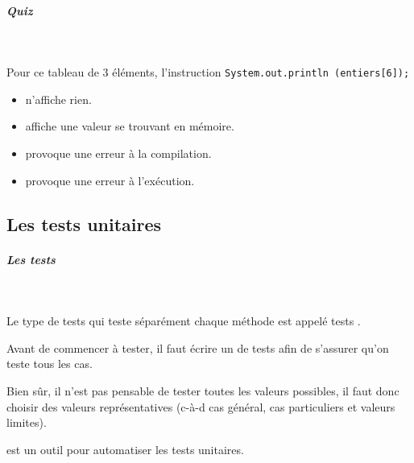 \documentclass[11pt,a4paper]{article}
\begin{document}
			
		\subparagraph{Quiz} 
		
                \textcolor{white}{.} \par
            Pour ce tableau de 3 \'el\'ements, l'instruction \verb|System.out.println (entiers[6]);|
            \begin{itemize} 
        
            \item[ \ding{"6D} ] n'affiche rien.
        
            \item[ \ding{"6D} ] affiche une valeur se trouvant en m\'emoire.
        
            \item[ \ding{"6D} ] provoque une erreur \`a la compilation.
        
            \item[ \ding{"6D} ] provoque une  erreur \`a l'ex\'ecution.
        
            \end{itemize} 
        \subsection{Les tests unitaires}
			
		\subparagraph{Les tests} 
		
                \textcolor{white}{.} \par
                
								Le type de tests qui  teste s\'epar\'ement chaque m\'ethode est appel\'e tests  \textcolor{gray}{\underline{\hspace*{10em}}} .
							
            \par
            
								Avant de commencer \`a tester, il faut \'ecrire un  \textcolor{gray}{\underline{\hspace*{3em}}}  de tests afin de s'assurer qu'on teste tous les cas.
							
            \par
            
								Bien s\^ur, il n'est pas pensable de tester toutes les valeurs possibles, il faut donc choisir des valeurs repr\'esentatives 
								(c-\`a-d cas g\'en\'eral, cas particuliers et valeurs limites).    
							
            \par
         \textcolor{gray}{\underline{\hspace*{3em}}}  est un outil pour automatiser les tests unitaires.
							
\end{document}
